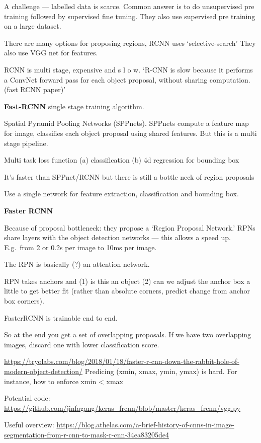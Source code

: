 \documentclass[12pt, a4paper, oneside, headinclude, footinclude]{article}
\begin{document}
A challenge --- labelled data is scarce. Common answer is to do unsupervised
pre training followed by supervised fine tuning. They also use supervised pre
training on a large dataset.

There are many options for proposing regions, RCNN uses `selective-search'
They also use VGG net for features.

RCNN is multi stage, expensive and s l o w. `R-CNN is slow because it performs
a ConvNet forward pass for each object proposal, without sharing computation.
(fast RCNN paper)'

\textbf{Fast-RCNN} single stage training algorithm. 

Spatial Pyramid Pooling Networks (SPPnets). SPPnets compute a feature map
for image, classifies each object proposal using shared features. But this is
a multi stage pipeline.

Multi task loss function
    (a) classification
    (b) 4d regression for bounding box

It's faster than SPPnet/RCNN but there is still a bottle neck of region
proposals

Use a single network for feature extraction, classification and bounding box.


\textbf{Faster RCNN}~\cite{Ren2017}

Because of proposal bottleneck: they propose a `Region Proposal Network.' RPNs
share layers with the object detection networks --- this allows a speed up.
E.g.\ from 2 or 0.2s per image to 10ms per image.

The RPN is basically (?) an attention network.

RPN takes anchors and (1) is this an object (2) can we adjust the anchor box
a little to get better fit (rather than absolute corners, predict change from
anchor box corners).

FasterRCNN is trainable end to end.

So at the end you get a set of overlapping proposals. If we have two
overlapping images, discard one with lower classification score.

\url{https://tryolabs.com/blog/2018/01/18/faster-r-cnn-down-the-rabbit-hole-of-modern-object-detection/}
Predicing (xmin, xmax, ymin, ymax) is hard. For instance, how to enforce
xmin < xmax

Potential code:
\url{https://github.com/jinfagang/keras\_frcnn/blob/master/keras\_frcnn/vgg.py}

Useful overview:
\url{https://blog.athelas.com/a-brief-history-of-cnns-in-image-segmentation-from-r-cnn-to-mask-r-cnn-34ea83205de4}
\end{document}
